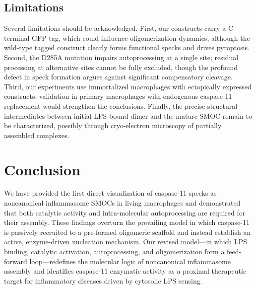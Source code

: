 \documentclass[11pt,a4paper]{article}
\begin{document}
\subsection{Limitations}

Several limitations should be acknowledged. First, our constructs carry a C-terminal GFP tag, which could influence oligomerization dynamics, although the wild-type tagged construct clearly forms functional specks and drives pyroptosis. Second, the D285A mutation impairs autoprocessing at a single site; residual processing at alternative sites cannot be fully excluded, though the profound defect in speck formation argues against significant compensatory cleavage. Third, our experiments use immortalized macrophages with ectopically expressed constructs; validation in primary macrophages with endogenous caspase-11 replacement would strengthen the conclusions. Finally, the precise structural intermediates between initial LPS-bound dimer and the mature SMOC remain to be characterized, possibly through cryo-electron microscopy of partially assembled complexes.

\section{Conclusion}
\label{sec:conclusion}

We have provided the first direct visualization of caspase-11 specks as noncanonical inflammasome SMOCs in living macrophages and demonstrated that both catalytic activity and intra-molecular autoprocessing are required for their assembly. These findings overturn the prevailing model in which caspase-11 is passively recruited to a pre-formed oligomeric scaffold and instead establish an active, enzyme-driven nucleation mechanism. Our revised model---in which LPS binding, catalytic activation, autoprocessing, and oligomerization form a feed-forward loop---redefines the molecular logic of noncanonical inflammasome assembly and identifies caspase-11 enzymatic activity as a proximal therapeutic target for inflammatory diseases driven by cytosolic LPS sensing.



\end{document}
